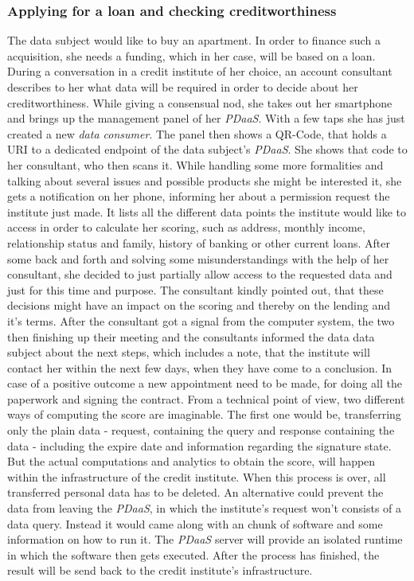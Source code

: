 \documentclass[12pt,english,a4paper,titlepage,cleardoublepage=empty,dottedtoc]{report}
\begin{document}
\subsubsection{Applying for a loan and checking
creditworthiness}\label{applying-for-a-loan-and-checking-creditworthiness}

The data subject would like to buy an apartment. In order to finance
such a acquisition, she needs a funding, which in her case, will be
based on a loan. During a conversation in a credit institute of her
choice, an account consultant describes to her what data will be
required in order to decide about her creditworthiness. While giving a
consensual nod, she takes out her smartphone and brings up the
management panel of her \emph{PDaaS}. With a few taps she has just
created a new \emph{data consumer}. The panel then shows a QR-Code, that
holds a URI to a dedicated endpoint of the data subject's \emph{PDaaS}.
She shows that code to her consultant, who then scans it. While handling
some more formalities and talking about several issues and possible
products she might be interested it, she gets a notification on her
phone, informing her about a permission request the institute just made.
It lists all the different data points the institute would like to
access in order to calculate her scoring, such as address, monthly
income, relationship status and family, history of banking or other
current loans. After some back and forth and solving some
misunderstandings with the help of her consultant, she decided to just
partially allow access to the requested data and just for this time and
purpose. The consultant kindly pointed out, that these decisions might
have an impact on the scoring and thereby on the lending and it's terms.
After the consultant got a signal from the computer system, the two then
finishing up their meeting and the consultants informed the data data
subject about the next steps, which includes a note, that the institute
will contact her within the next few days, when they have come to a
conclusion. In case of a positive outcome a new appointment need to be
made, for doing all the paperwork and signing the contract. From a
technical point of view, two different ways of computing the score are
imaginable. The first one would be, transferring only the plain data -
request, containing the query and response containing the data -
including the expire date and information regarding the signature state.
But the actual computations and analytics to obtain the score, will
happen within the infrastructure of the credit institute. When this
process is over, all transferred personal data has to be deleted. An
alternative could prevent the data from leaving the \emph{PDaaS}, in
which the institute's request won't consists of a data query. Instead it
would came along with an chunk of software and some information on how
to run it. The \emph{PDaaS} server will provide an isolated runtime in
which the software then gets executed. After the process has finished,
the result will be send back to the credit institute's infrastructure.
\end{document}
